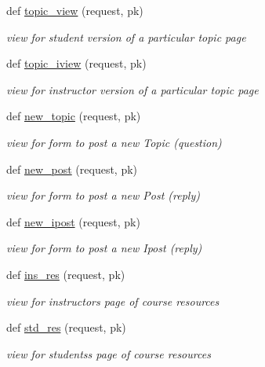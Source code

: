 \begin{DoxyCompactItemize}
def \hyperlink{namespaceviews_a0c10a5a6ad68330b33726173b843340a}{topic\+\_\+view} (request, pk)
\begin{DoxyCompactList}\small\item\em view for student version of a particular topic page \end{DoxyCompactList}\item 
def \hyperlink{namespaceviews_a5775d94fcba230401b446d1435ee8a14}{topic\+\_\+iview} (request, pk)
\begin{DoxyCompactList}\small\item\em view for instructor version of a particular topic page \end{DoxyCompactList}\item 
def \hyperlink{namespaceviews_a4262e578ff0077ae1497a63a0c3ec68b}{new\+\_\+topic} (request, pk)
\begin{DoxyCompactList}\small\item\em view for form to post a new Topic (question) \end{DoxyCompactList}\item 
def \hyperlink{namespaceviews_ad4012f8d2cd2e8fdfb7d1064e0a2ca42}{new\+\_\+post} (request, pk)
\begin{DoxyCompactList}\small\item\em view for form to post a new Post (reply) \end{DoxyCompactList}\item 
def \hyperlink{namespaceviews_a7b7af8f9e6aa94c9144caf9a64bd5f48}{new\+\_\+ipost} (request, pk)
\begin{DoxyCompactList}\small\item\em view for form to post a new Ipost (reply) \end{DoxyCompactList}\item 
def \hyperlink{namespaceviews_a53334dbcf31c44721538082b8870d457}{ins\+\_\+res} (request, pk)
\begin{DoxyCompactList}\small\item\em view for instructor\textquotesingle{}s page of course resources \end{DoxyCompactList}\item 
def \hyperlink{namespaceviews_a9fc4275fee72654b4aa705cabd902eea}{std\+\_\+res} (request, pk)
\begin{DoxyCompactList}\small\item\em view for students\textquotesingle{}s page of course resources \end{DoxyCompactList}\item 

\end{DoxyCompactItemize}

